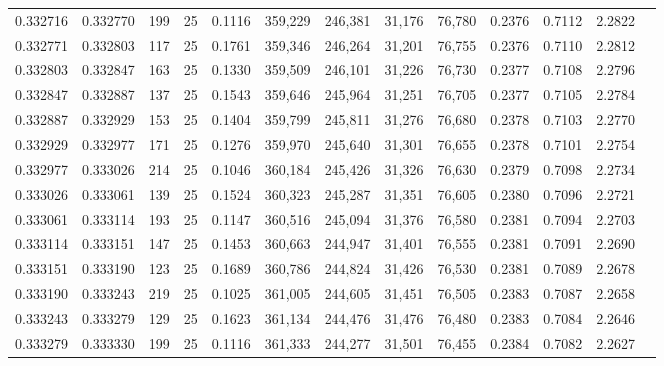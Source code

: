 \begin{tabular}{rrrrrrrrrrrrr}
0.332716 & 0.332770 &   199 &  25 &                                     0.1116 & 359,229 & 246,381 &  31,176 &  76,780 & 0.2376 & 0.7112 & 2.2822 \\
0.332771 & 0.332803 &   117 &  25 &                                     0.1761 & 359,346 & 246,264 &  31,201 &  76,755 & 0.2376 & 0.7110 & 2.2812 \\
0.332803 & 0.332847 &   163 &  25 &                                     0.1330 & 359,509 & 246,101 &  31,226 &  76,730 & 0.2377 & 0.7108 & 2.2796 \\
0.332847 & 0.332887 &   137 &  25 &                                     0.1543 & 359,646 & 245,964 &  31,251 &  76,705 & 0.2377 & 0.7105 & 2.2784 \\
0.332887 & 0.332929 &   153 &  25 &                                     0.1404 & 359,799 & 245,811 &  31,276 &  76,680 & 0.2378 & 0.7103 & 2.2770 \\
0.332929 & 0.332977 &   171 &  25 &                                     0.1276 & 359,970 & 245,640 &  31,301 &  76,655 & 0.2378 & 0.7101 & 2.2754 \\
0.332977 & 0.333026 &   214 &  25 &                                     0.1046 & 360,184 & 245,426 &  31,326 &  76,630 & 0.2379 & 0.7098 & 2.2734 \\
0.333026 & 0.333061 &   139 &  25 &                                     0.1524 & 360,323 & 245,287 &  31,351 &  76,605 & 0.2380 & 0.7096 & 2.2721 \\
0.333061 & 0.333114 &   193 &  25 &                                     0.1147 & 360,516 & 245,094 &  31,376 &  76,580 & 0.2381 & 0.7094 & 2.2703 \\
0.333114 & 0.333151 &   147 &  25 &                                     0.1453 & 360,663 & 244,947 &  31,401 &  76,555 & 0.2381 & 0.7091 & 2.2690 \\
0.333151 & 0.333190 &   123 &  25 &                                     0.1689 & 360,786 & 244,824 &  31,426 &  76,530 & 0.2381 & 0.7089 & 2.2678 \\
0.333190 & 0.333243 &   219 &  25 &                                     0.1025 & 361,005 & 244,605 &  31,451 &  76,505 & 0.2383 & 0.7087 & 2.2658 \\
0.333243 & 0.333279 &   129 &  25 &                                     0.1623 & 361,134 & 244,476 &  31,476 &  76,480 & 0.2383 & 0.7084 & 2.2646 \\
0.333279 & 0.333330 &   199 &  25 &                                     0.1116 & 361,333 & 244,277 &  31,501 &  76,455 & 0.2384 & 0.7082 & 2.2627 \\

\end{tabular}
